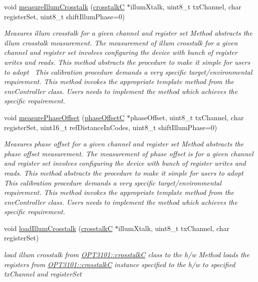 \begin{DoxyCompactItemize}
void \mbox{\hyperlink{class_o_p_t3101_1_1device_a839d95aec303413e322382ff9e2228d4}{measure\+Illum\+Crosstalk}} (\mbox{\hyperlink{class_o_p_t3101_1_1crosstalk_c}{crosstalkC}} $\ast$illum\+Xtalk, uint8\+\_\+t tx\+Channel, char register\+Set, uint8\+\_\+t shift\+Illum\+Phase=0)
\begin{DoxyCompactList}\small\item\em Measures illum crosstalk for a given channel and register set Method abstracts the illum crosstalk measurement. The measurement of illum crosstalk for a given channel and register set involves configuring the device with bunch of register writes and reads. This method abstracts the procedure to make it simple for users to adopt~\newline
 This calibration procedure demands a very specific target/environmental requirement. This method invokes the appropriate template method from the env\+Controller class. Users needs to implement the method which achieves the specific requirement. \end{DoxyCompactList}\item 
void \mbox{\hyperlink{class_o_p_t3101_1_1device_a711d9737370bed043a85ced752c8ebb5}{measure\+Phase\+Offset}} (\mbox{\hyperlink{class_o_p_t3101_1_1phase_offset_c}{phase\+OffsetC}} $\ast$phase\+Offset, uint8\+\_\+t tx\+Channel, char register\+Set, uint16\+\_\+t ref\+Distance\+In\+Codes, uint8\+\_\+t shift\+Illum\+Phase=0)
\begin{DoxyCompactList}\small\item\em Measures phase offset for a given channel and register set Method abstracts the phase offset measurement. The measurement of phase offset is for a given channel and register set involves configuring the device with bunch of register writes and reads. This method abstracts the procedure to make it simple for users to adopt~\newline
 This calibration procedure demands a very specific target/environmental requirement. This method invokes the appropriate template method from the env\+Controller class. Users needs to implement the method which achieves the specific requirement. \end{DoxyCompactList}\item 
void \mbox{\hyperlink{class_o_p_t3101_1_1device_acb915ffb10d3c725fe4a58f22d69d27d}{load\+Illum\+Crosstalk}} (\mbox{\hyperlink{class_o_p_t3101_1_1crosstalk_c}{crosstalkC}} $\ast$illum\+Xtalk, uint8\+\_\+t tx\+Channel, char register\+Set)
\begin{DoxyCompactList}\small\item\em load illum crosstalk from \mbox{\hyperlink{class_o_p_t3101_1_1crosstalk_c}{O\+P\+T3101\+::crosstalkC}} class to the h/w Method loads the registers from \mbox{\hyperlink{class_o_p_t3101_1_1crosstalk_c}{O\+P\+T3101\+::crosstalkC}} instance specified to the h/w to specified tx\+Channel and register\+Set \end{DoxyCompactList}\item 

\end{DoxyCompactItemize}
